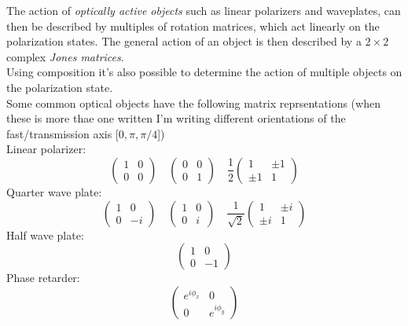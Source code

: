 \documentclass[../electromagnetism.tex]{subfiles}
\begin{document}
The action of \textit{optically active objects} such as linear polarizers and waveplates, can then be described by multiples of rotation matrices, which act linearly on the polarization states. The general action of an object is then described by a $2\times2$ complex \textit{Jones matrices}.\\
Using composition it's also possible to determine the action of multiple objects on the polarization state.\\
Some common optical objects have the following matrix reprsentations (when these is more thae one written I'm writing different orientations of the fast/transmission axis [$0, \pi, \pi/4$])\\
Linear polarizer:
\begin{equation}
	\begin{pmatrix}
		1&0\\0&0
	\end{pmatrix}\quad\begin{pmatrix}
		0&0\\0&1
	\end{pmatrix}\quad\frac{1}{2}\begin{pmatrix}
		1&\pm1\\\pm1&1
	\end{pmatrix}
	\label{eq:linpol.jpol}
\end{equation}
Quarter wave plate:
\begin{equation}
	\begin{pmatrix}
		1&0\\0&-i
	\end{pmatrix}\quad\begin{pmatrix}
		1&0\\0&i
	\end{pmatrix}\quad\frac{1}{\sqrt{2}}\begin{pmatrix}
		1&\pm i\\\pm i&1
	\end{pmatrix}
	\label{eq:qwp.jpol}
\end{equation}
Half wave plate:
\begin{equation}
	\begin{pmatrix}
		1&0\\0&-1
	\end{pmatrix}
	\label{eq:hwp.jpol}
\end{equation}
Phase retarder:
\begin{equation}
	\begin{pmatrix}
		e^{i\phi_x}&0\\0&e^{i\phi_y}
	\end{pmatrix}
	\label{eq:pr.jpol}
\end{equation}
\end{document}
